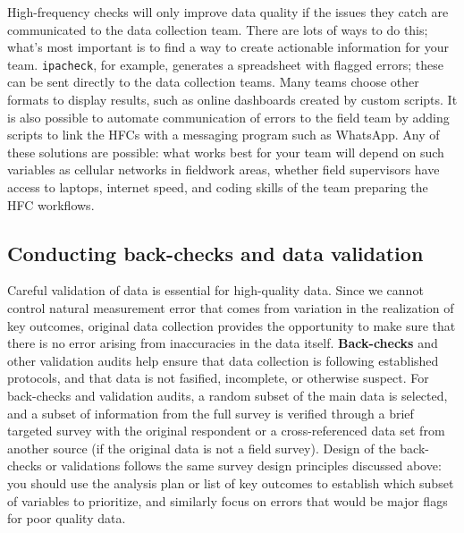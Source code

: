 High-frequency checks will only improve data quality
if the issues they catch are communicated to the data collection team.
There are lots of ways to do this;
what's most important is to find a way to create actionable information for your team.
\texttt{ipacheck}, for example, generates a spreadsheet with flagged errors;
these can be sent directly to the data collection teams.
Many teams choose other formats to display results,
such as online dashboards created by custom scripts.
It is also possible to automate communication of errors to the field team
by adding scripts to link the HFCs with a messaging program such as WhatsApp.
Any of these solutions are possible:
what works best for your team will depend on such variables as
cellular networks in fieldwork areas, whether field supervisors have access to laptops,
internet speed, and coding skills of the team preparing the HFC workflows.

\subsection{Conducting back-checks and data validation}

Careful validation of data is essential for high-quality data.
Since we cannot control natural measurement error
that comes from variation in the realization of key outcomes,
original data collection provides the opportunity to make sure
that there is no error arising from inaccuracies in the data itself.
\textbf{Back-checks} and
other validation audits help ensure that data collection is following established protocols,
and that data is not fasified, incomplete, or otherwise suspect.
For back-checks and validation audits, a random subset of the main data is selected,
and a subset of information from the full survey is
verified through a brief targeted survey with the original respondent
or a cross-referenced data set from another source (if the original data is not a field survey).
Design of the back-checks or validations follows the same survey design
principles discussed above: you should use the analysis plan
or list of key outcomes to establish which subset of variables to prioritize,
and similarly focus on errors that would be major flags for poor quality data.

